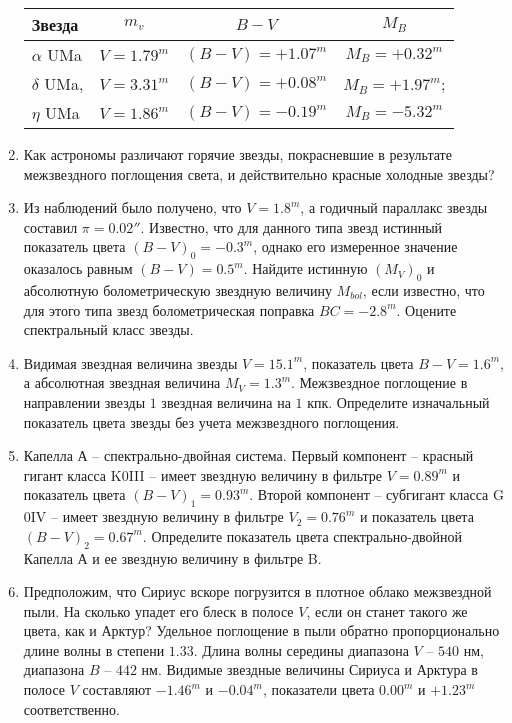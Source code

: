 \documentclass[12pt]{article}
\begin{document}
\begin{enumerate}[resume]
        \begin{center}
        \begin{tabular}[t]{|l|c|c|c|}
            \hline
            \hline
        Звезда &  $m_v$ & $B-V$ & $M_B$\\
        \hline
        $\alpha$ UMa & $V=1.79^m$ & $(B-V) = + 1.07^m$ & $M_B=+0.32^m$\\
        \hline
        $\delta$ UMa, & $V=3.31^m$ & $(B-V) = + 0.08^m$ & $M_B=+ 1.97^m$; \\
        \hline 
        $\eta$ UMa & $V= 1.86^m$ & $(B-V)= -0.19^m$ & $M_B=- 5.32^m$ \\
            \hline
            \hline 
        \end{tabular}
        \end{center}
        \item Как астрономы различают горячие звезды, покрасневшие в результате  межзвездного поглощения света, и действительно красные холодные звезды?
        \item Из наблюдений было получено, что $V = 1.8^m$, а годичный параллакс звезды составил $\pi=0.02''$. Известно, что для данного типа звезд истинный показатель цвета $(B-V)_0=-0.3^m$, однако его измеренное значение оказалось равным $(B-V)=0.5^m$. Найдите истинную $(M_V)_0$ и абсолютную болометрическую звездную величину $M_{bol}$, если известно, что для этого типа звезд болометрическая поправка $BC=-2.8^m$. Оцените спектральный класс звезды. 
        \item Видимая звездная величина звезды $V=15.1^m$, показатель цвета $B-V=1.6^m$, а абсолютная звездная величина $M_V=1.3^m$. Межзвездное поглощение в направлении звезды $1$ звездная величина на $1$ кпк. Определите изначальный показатель цвета звезды без учета межзвездного поглощения.
        \item Капелла А -- спектрально-двойная система. Первый компонент -- красный гигант класса K$0$III -- имеет звездную величину в фильтре $V=0.89^m$ и показатель цвета $(B-V)_{1}=0.93^m$. Второй компонент -- субгигант класса G$0$IV -- имеет звездную величину в фильтре $V_2=0.76^m$ и показатель цвета $(B-V)_{2}=0.67^m$. Определите показатель цвета спектрально-двойной Капелла А и ее звездную величину в фильтре B.
        \item Предположим, что Сириус вскоре погрузится в плотное облако межзвездной пыли. На сколько упадет его блеск в полосе $V$, если он станет такого же цвета, как и Арктур? Удельное поглощение в пыли обратно пропорционально длине волны в степени $1.33$. Длина волны середины диапазона $V$ -- $540$ нм, диапазона $B$ -- $442$ нм. Видимые звездные величины Сириуса и Арктура в полосе $V$ составляют $-1.46^m$ и $-0.04^m$, показатели цвета $0.00^m$ и $+1.23^m$ соответственно.

\end{enumerate}
\end{document}
